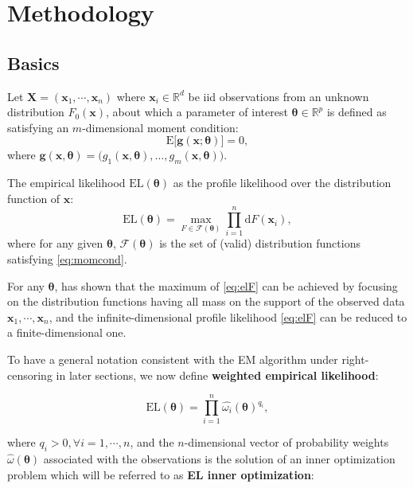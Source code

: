 \documentclass[article]{jss}
\newcommand{\XX}{\bm X}
\newcommand{\xx}{\bm x}
\newcommand{\tth}{\bm \theta}
\newcommand{\R}{\mathbb R}
\renewcommand{\gg}{\bm g}
\newcommand{\w}{\omega}
\renewcommand{\E}{\textrm{E}}
\newcommand{\EL}{\textrm{EL}}
\renewcommand{\|}{\,|\,}
\begin{document}
\hypertarget{methodology}{%
\section{Methodology}\label{methodology}}

\hypertarget{basics}{%
\subsection{Basics}\label{basics}}

Let \(\XX = (\xx_1,\cdots,\xx_n)\) where \(\xx_i\in\R^d\) be iid observations from an unknown distribution \(F_0(\xx)\), about which a parameter of interest \(\tth \in \R^p\) is defined as satisfying an \(m\)-dimensional moment condition:
\begin{equation} \label{eq:momcond}
  \E\bigl[\gg(\xx;\tth)\bigr] = 0,
\end{equation}
where \(\gg(\xx, \tth) = \bigl( g_1(\xx, \tth), \ldots, g_m(\xx, \tth) \bigr)\).

The empirical likelihood \(\EL(\tth)\) as the profile likelihood over the distribution function of \(\xx\):
\begin{equation} \label{eq:elF}
  \EL(\tth) = \max_{F \in \mathcal F(\tth)} \prod_{i=1}^n \mathrm{d} F(\xx_i),
\end{equation}
where for any given \(\tth\), \(\mathcal F(\tth)\) is the set of (valid) distribution functions satisfying \eqref{eq:momcond}.

For any \(\tth\), \citet{owen1988} has shown that the maximum of \eqref{eq:elF} can be achieved by focusing on the distribution functions having all mass on the support of the observed data \(\xx_1, \cdots, \xx_n\), and the infinite-dimensional profile likelihood \eqref{eq:elF} can be reduced to a finite-dimensional one.

To have a general notation consistent with the EM algorithm under right-censoring in later sections, we now define \textbf{weighted empirical likelihood}:

\begin{equation}
  \EL(\tth) = \prod_{i=1}^n \hat{\w_i}(\tth)^{q_i},
\end{equation}

where \(q_i > 0, \forall i=1,\cdots,n\), and the \(n\)-dimensional vector of probability weights \(\hat{\w}(\tth)\) associated with the observations is the solution of an inner optimization problem which will be referred to as \textbf{EL inner optimization}:
\end{document}
